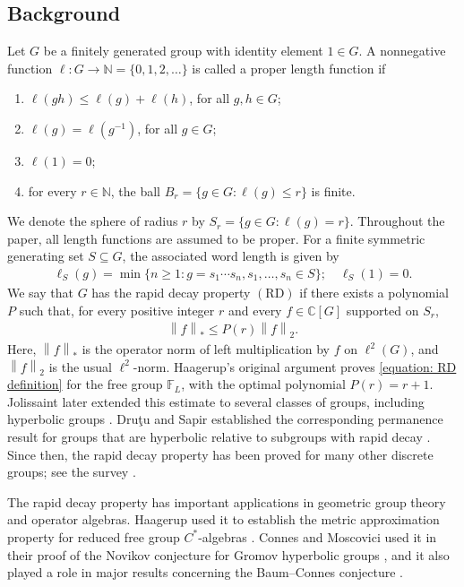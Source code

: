 \documentclass[12pt,reqno]{amsart}
\newcommand{\C}{\mathbb{C}}
\newcommand{\N}{\mathbb{N}}
\newcommand{\norm}[1]{\left\|#1\right\|}
\newcommand{\RD}{\operatorname{(RD)}}
\numberwithin{equation}{section}
\begin{document}
\subsection{Background} Let $G$ be a finitely generated group with identity element $1\in G$. A nonnegative function $\ell:G\to \N=\{0,1,2,\ldots\}$ is called a proper length function if
\begin{enumerate}
    \item $\ell(gh)\le \ell(g)+\ell(h)$, for all $g,h\in G$;
    \item $\ell(g)=\ell(g^{-1})$, for all $g\in G$;
    \item $\ell(1)=0$;
    \item for every $r\in \N$, the ball $B_r=\{g\in G: \ell(g)\le r\}$ is finite.
\end{enumerate}
We denote the sphere of radius $r$ by $S_r=\{g\in G: \ell(g)=r\}$. Throughout the paper, all length functions are assumed to be proper.
For a finite symmetric generating set $S\subseteq G$, the associated word length is given by
\begin{align*}
    \ell_S(g)=\min\{n\ge 1: g=s_1\cdots s_n, s_1,\ldots,s_n\in S\};\quad \ell_S(1)=0.
\end{align*}
We say that $G$ has the rapid decay property $\RD$ if there exists a polynomial $P$ such that, for every positive integer $r$ and every $f\in \C[G]$ supported on $S_r$,
\begin{align}\label{equation: RD definition}
    \norm{f}_*\le P(r)\norm{f}_2.
\end{align}
Here, $\norm{f}_*$ is the operator norm of left multiplication by $f$ on $\ell^2(G)$, and $\norm{f}_2$ is the usual $\ell^2$-norm. Haagerup's original argument \cite{Haagerup1978originalpaper} proves \eqref{equation: RD definition} for the free group $\mathbb{F}_L$, with the optimal polynomial $P(r)=r+1$. Jolissaint later extended this estimate to several classes of groups, including hyperbolic groups \cite{Jolissaint1990RD}. Dru{\c{t}}u and Sapir established the corresponding permanence result for groups that are hyperbolic relative to subgroups with rapid decay \cite{DrutuSapirrelativehyperbolic}. Since then, the rapid decay property has been proved for many other discrete groups; see the survey \cite{Chatterji2017Introduction}.

The rapid decay property has important applications in geometric group theory and operator algebras. Haagerup used it to establish the metric approximation property for reduced free group $C^*$-algebras \cite{Haagerup1978originalpaper}. Connes and Moscovici used it in their proof of the Novikov conjecture for Gromov hyperbolic groups \cite{ConnesHenri1990Novikovconjecture}, and it also played a role in major results concerning the Baum--Connes conjecture \cite{Lafforgue2002BaumConnes}.
\end{document}
